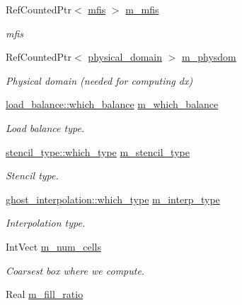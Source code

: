 \begin{DoxyCompactItemize}
\item 
Ref\+Counted\+Ptr$<$ \hyperlink{classmfis}{mfis} $>$ \hyperlink{classamr__mesh_aff98cae1e8b881da102b39f277f32005}{m\+\_\+mfis}
\begin{DoxyCompactList}\small\item\em mfis \end{DoxyCompactList}\item 
Ref\+Counted\+Ptr$<$ \hyperlink{classphysical__domain}{physical\+\_\+domain} $>$ \hyperlink{classamr__mesh_a151c0e5d28e637c42e9d8b912aa1d5e8}{m\+\_\+physdom}
\begin{DoxyCompactList}\small\item\em Physical domain (needed for computing dx) \end{DoxyCompactList}\item 
\hyperlink{classload__balance_aeda8ae1759629dfa65e6691678d0b3b9}{load\+\_\+balance\+::which\+\_\+balance} \hyperlink{classamr__mesh_ae583f1a97486c3051132f24330be6e03}{m\+\_\+which\+\_\+balance}
\begin{DoxyCompactList}\small\item\em Load balance type. \end{DoxyCompactList}\item 
\hyperlink{namespacestencil__type_a1ffed19935b7289b50e8dcc017ee99c8}{stencil\+\_\+type\+::which\+\_\+type} \hyperlink{classamr__mesh_a8563dddb0f8cc6946e0e865c0e90dae4}{m\+\_\+stencil\+\_\+type}
\begin{DoxyCompactList}\small\item\em Stencil type. \end{DoxyCompactList}\item 
\hyperlink{namespaceghost__interpolation_a2e226123d3c841dd1034c7e62db3468c}{ghost\+\_\+interpolation\+::which\+\_\+type} \hyperlink{classamr__mesh_ad83f7626ddaaaaf3e5026d1f54a89a5b}{m\+\_\+interp\+\_\+type}
\begin{DoxyCompactList}\small\item\em Interpolation type. \end{DoxyCompactList}\item 
Int\+Vect \hyperlink{classamr__mesh_af038a31e02563d072e56a0c28030755a}{m\+\_\+num\+\_\+cells}
\begin{DoxyCompactList}\small\item\em Coarsest box where we compute. \end{DoxyCompactList}\item 
Real \hyperlink{classamr__mesh_a4bdad13eb36fb4c38fbdff019c729664}{m\+\_\+fill\+\_\+ratio}

\end{DoxyCompactItemize}
